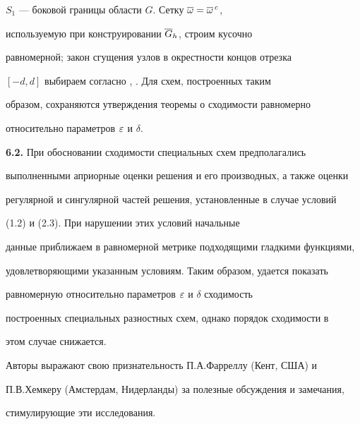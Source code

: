 $S_1$ --- боковой границы области $G$. Сетку $\overline{\omega}=\overline{\omega}^{\,c}$,


используемую при конструировании $\overline{G}_h$, строим кусочно


равномерной; закон сгущения узлов в окрестности концов отрезка


$[-d,d]$ выбираем согласно \cite{Sh1}, \cite{Sh4}. Для схем, построенных таким


образом, сохраняются утверждения теоремы о сходимости равномерно


относительно параметров $\varepsilon$ и $\delta$.





{\bf 6.2.} При обосновании сходимости специальных схем предполагались


выполненными априорные оценки решения и его производных, а также оценки 


регулярной и сингулярной частей решения, установленные в случае условий


(1.2) и (2.3). При нарушении этих условий начальные


данные приближаем в равномерной метрике подходящими гладкими функциями,


удовлетворяющими указанным условиям. Таким образом, удается показать


равномерную относительно параметров $\varepsilon$ и $\delta$ сходимость


построенных специальных разностных схем, однако порядок сходимости в


этом случае снижается.





 


Авторы выражают свою признательность П.А.Фарреллу (Кент, США) и


П.В.Хемкеру (Амстердам, Нидерланды) за полезные обсуждения и замечания,


стимулирующие эти исследования.








